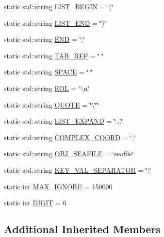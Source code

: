 \begin{DoxyCompactItemize}
\item 
static std\-::string \hyperlink{classosea_1_1ofreq_1_1ioword_a775e20c2e5fca4c2f9ac92fdd03d4df6}{L\-I\-S\-T\-\_\-\-B\-E\-G\-I\-N} = \char`\"{}(\char`\"{}
\item 
static std\-::string \hyperlink{classosea_1_1ofreq_1_1ioword_a57eccd642a760b04c22677dfb102ac59}{L\-I\-S\-T\-\_\-\-E\-N\-D} = \char`\"{})\char`\"{}
\item 
static std\-::string \hyperlink{classosea_1_1ofreq_1_1ioword_a41b127993e1339c4e8f365d875a0bd83}{E\-N\-D} = \char`\"{};\char`\"{}
\item 
static std\-::string \hyperlink{classosea_1_1ofreq_1_1ioword_a62db7db62399bfac9af746ac589801b2}{T\-A\-B\-\_\-\-R\-E\-F} = \char`\"{} \char`\"{}
\item 
static std\-::string \hyperlink{classosea_1_1ofreq_1_1ioword_a54c428ab554e48d488643a794c7d5ec5}{S\-P\-A\-C\-E} = \char`\"{} \char`\"{}
\item 
static std\-::string \hyperlink{classosea_1_1ofreq_1_1ioword_ab0b5cdd9f31f7a0b506db27812fe978e}{E\-O\-L} = \char`\"{}\textbackslash{}n\char`\"{}
\item 
static std\-::string \hyperlink{classosea_1_1ofreq_1_1ioword_a36a08500affa80665623032db7ca1eff}{Q\-U\-O\-T\-E} = \char`\"{}\textbackslash{}\char`\"{}\char`\"{}
\item 
static std\-::string \hyperlink{classosea_1_1ofreq_1_1ioword_a7044cf3828d3f8d89b03774337f3e5ac}{L\-I\-S\-T\-\_\-\-E\-X\-P\-A\-N\-D} = \char`\"{}...\char`\"{}
\item 
static std\-::string \hyperlink{classosea_1_1ofreq_1_1ioword_a010f0a47436472569b3135f3a0832383}{C\-O\-M\-P\-L\-E\-X\-\_\-\-C\-O\-O\-R\-D} = \char`\"{},\char`\"{}
\item 
static std\-::string \hyperlink{classosea_1_1ofreq_1_1ioword_a979ed65ebd588bc45d75043183cb8301}{O\-B\-J\-\_\-\-S\-E\-A\-F\-I\-L\-E} = \char`\"{}seafile\char`\"{}
\item 
static std\-::string \hyperlink{classosea_1_1ofreq_1_1ioword_a2c4ef10050934d8d6e8510560725e4eb}{K\-E\-Y\-\_\-\-V\-A\-L\-\_\-\-S\-E\-P\-A\-R\-A\-T\-O\-R} = \char`\"{}\-:\char`\"{}
\item 
static int \hyperlink{classosea_1_1ofreq_1_1ioword_a3f9e4aa76ff26168e9b07f37776765eb}{M\-A\-X\-\_\-\-I\-G\-N\-O\-R\-E} = 150000
\item 
static int \hyperlink{classosea_1_1ofreq_1_1ioword_af02e800557869d72c2e10b56bd29a120}{D\-I\-G\-I\-T} = 6
\end{DoxyCompactItemize}
\subsection*{Additional Inherited Members}


